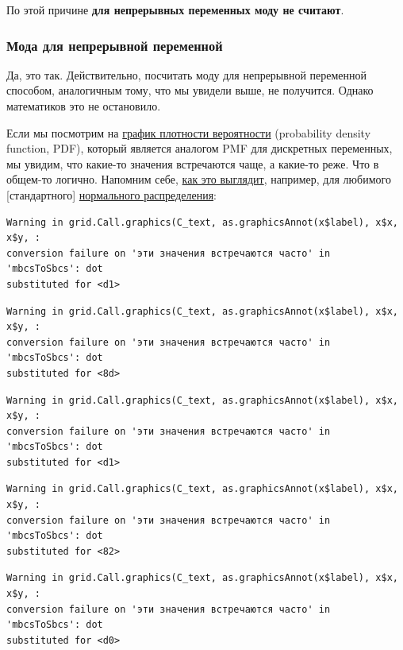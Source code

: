 \documentclass[
  letterpaper,
]{scrbook}
\theoremstyle{definition}
\theoremstyle{remark}
\begin{document}
По этой причине \textbf{для непрерывных переменных моду не считают}.

\subsubsection{Мода для непрерывной
переменной}\label{andan-descriptives-mode-contunious}

Да, это так. Действительно, посчитать моду для непрерывной переменной
способом, аналогичным тому, что мы увидели выше, не получится. Однако
математиков это не остановило.

Если мы посмотрим на \href{}{график плотности вероятности} (probability
density function, PDF), который является аналогом PMF для дискретных
переменных, мы увидим, что какие-то значения встречаются чаще, а
какие-то реже. Что в общем-то логично. Напомним себе, \href{}{как это
выглядит}, например, для любимого {[}стандартного{]} \href{}{нормального
распределения}:

\begin{verbatim}
Warning in grid.Call.graphics(C_text, as.graphicsAnnot(x$label), x$x, x$y, :
conversion failure on 'эти значения встречаются часто' in 'mbcsToSbcs': dot
substituted for <d1>
\end{verbatim}

\begin{verbatim}
Warning in grid.Call.graphics(C_text, as.graphicsAnnot(x$label), x$x, x$y, :
conversion failure on 'эти значения встречаются часто' in 'mbcsToSbcs': dot
substituted for <8d>
\end{verbatim}

\begin{verbatim}
Warning in grid.Call.graphics(C_text, as.graphicsAnnot(x$label), x$x, x$y, :
conversion failure on 'эти значения встречаются часто' in 'mbcsToSbcs': dot
substituted for <d1>
\end{verbatim}

\begin{verbatim}
Warning in grid.Call.graphics(C_text, as.graphicsAnnot(x$label), x$x, x$y, :
conversion failure on 'эти значения встречаются часто' in 'mbcsToSbcs': dot
substituted for <82>
\end{verbatim}

\begin{verbatim}
Warning in grid.Call.graphics(C_text, as.graphicsAnnot(x$label), x$x, x$y, :
conversion failure on 'эти значения встречаются часто' in 'mbcsToSbcs': dot
substituted for <d0>
\end{verbatim}
\end{document}
